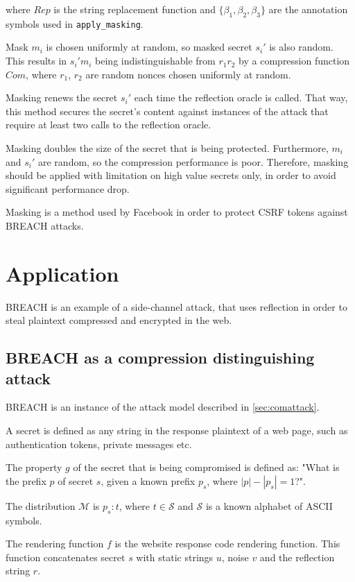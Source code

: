 \documentclass[conference, letterpaper, 10pt]{IEEEtran}
\begin{document}
where $Rep$ is the string replacement function and $\{\beta_1, \beta_2,
\beta_3\}$ are the annotation symbols used in \texttt{apply\_masking}.

Mask $m_i$ is chosen uniformly at random, so masked secret $s_i'$ is also
random. This results in $s_i' m_i$ being indistinguishable from $r_1 r_2$ by a
compression function $Com$, where $r_1$, $r_2$ are random nonces chosen
uniformly at random.

Masking renews the secret $s_i'$ each time the reflection oracle is called. That
way, this method secures the secret's content against instances of the attack
that require at least two calls to the reflection oracle.

Masking doubles the size of the secret that is being protected. Furthermore,
$m_i$ and $s_i'$ are random, so the compression performance is poor. Therefore,
masking should be applied with limitation on high value secrets only, in order
to avoid significant performance drop.

Masking is a method used by Facebook \cite{c11} in order to protect CSRF tokens
against BREACH attacks.

\section{Application}\label{sec:application}

BREACH is an example of a side-channel attack, that uses reflection in
order to steal plaintext compressed and encrypted in the web.

\subsection{BREACH as a compression distinguishing
attack}\label{subsec:breachapp}
BREACH is an instance of the attack model described in \ref{sec:comattack}.

A secret is defined as any string in the response plaintext of a web page, such
as authentication tokens, private messages etc.

The property $g$ of the secret that is being compromised is defined as: "What is
the prefix $p$ of secret $s$, given a known prefix $p_s$, where $|p| - |p_s| =
1$?".

The distribution $\mathcal{M}$ is ${p_s:t}$, where $t \in \mathcal{S}$ and
$\mathcal{S}$ is a known alphabet of ASCII symbols.

The rendering function $f$ is the website response code rendering function. This
function concatenates secret $s$ with static strings $u$, noise $v$ and the
reflection string $r$.
\end{document}
